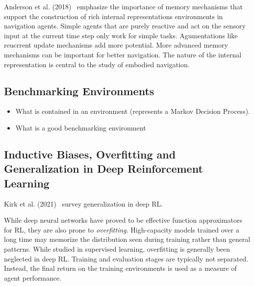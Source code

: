 Anderson et al. (2018)~\cite{anderson_evaluation_2018} emphasize the importance of memory mechanisms that support the construction of rich internal representations environments in navigation agents.
Simple agents that are purely reactive and act on the sensory input at the current time step only work for simple tasks.
Agumentations like reucrrent update mechanisms add more potential.
More advanced memory mechanisms can be important for better navigation.
The nature of the internal representation is central to the study of embodied navigation.
% 


\subsection{Benchmarking Environments}

\begin{itemize}
    \item What is contained in an environment (represents a Markov Decision Process).
    \item What is a good benchmarking environment
\end{itemize}

\subsection{Inductive Biases, Overfitting and Generalization in Deep Reinforcement Learning}


Kirk et al. (2021)~\cite{kirk_survey_2022} survey generalization in deep RL.


While deep neural networks have proved to be effective function approximators for RL, they are also prone to \textit{overfitting}.
High-capacity models trained over a long time may memorize the distribution seen during training rather than general patterns.
While studied in supervised learning, overfitting is generally been neglected in deep RL.
Training and evaluation stages are typically not separated.
Instead, the final return on the training environments is used as a measure of agent performance.

